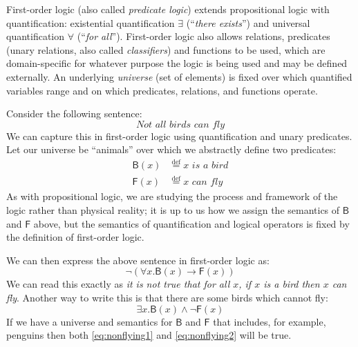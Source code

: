 \renewcommand{\highlight}[1]{%
  \colorbox{yellow!50}{$\displaystyle#1$}}
\newcommand{\highlightG}[1]{%
  \colorbox{green!30}{$\displaystyle#1$}}
\newcommand{\highlightR}[1]{%
  \colorbox{red!20}{$\displaystyle#1$}}

\newcommand{\rel}[1]{\mathsf{#1}}


First-order logic (also called \emph{predicate logic}) extends
propositional logic with quantification: existential quantification
$\exists$ (``\emph{there exists}'') and universal quantification
$\forall$ (``\emph{for all}'').  First-order logic also allows
relations, predicates (unary relations, also called \emph{classifiers}) and
functions to be used, which are
domain-specific for whatever purpose the logic is being used and may
be defined externally. An underlying \emph{universe} (set of elements) is fixed
over which quantified variables range and on which predicates,
relations, and functions operate.

Consider the following sentence:
%
\begin{equation*}
  \textit{Not all birds can fly}
\end{equation*}
%
We can capture this in first-order logic using quantification and
unary predicates. Let our universe be ``animals''
over which we abstractly define two predicates:
%
\begin{align*}
  \rel{B}(x) &\stackrel{\text{def}}{=} \textit{$x$ is a bird} \\
  \rel{F}(x) & \stackrel{\text{def}}{=} \textit{$x$ can fly}
\end{align*}
%
As with propositional logic, we are studying the process and framework
of the logic rather than physical reality; it is up to us how we
assign the semantics of $\rel{B}$ and $\rel{F}$ above, but the
semantics of quantification and logical operators is fixed by the
definition of first-order logic.

We can then express the above sentence in first-order logic as:
%
\begin{equation}
  \neg (\forall x . \rel{B}(x) \rightarrow \rel{F}(x))
  \label{eq:nonflying1}
\end{equation}
%
We can read this exactly as \emph{it is not true that for all $x$, if
  $x$ is a bird then $x$ can fly}. Another way to write this is
that there are some birds which cannot fly:
%
\begin{equation}
  \exists x . \rel{B}(x) \wedge \neg \rel{F}(x)
    \label{eq:nonflying2}
\end{equation}
%
If we have a universe and semantics for $\rel{B}$ and $\rel{F}$ that includes, for
example, penguins then both \eqref{eq:nonflying1} and
\eqref{eq:nonflying2} will be true.

